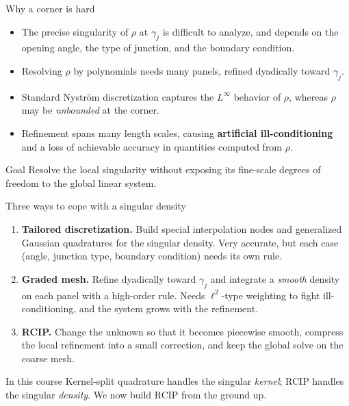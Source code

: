 \documentclass[aspectratio=169,11pt]{beamer}
\newcommand{\hl}[1]{{\color{CCMorange}\textbf{#1}}}
\begin{document}
\begin{frame}{Why a corner is hard}
\small
\begin{itemize}
  \item The precise singularity of $\rho$ at $\gamma_j$ is difficult to analyze,
  and depends on the opening angle, the type of junction, and the boundary
  condition.
  \item Resolving $\rho$ by polynomials needs many panels, refined dyadically
  toward $\gamma_j$.
  \item Standard Nystr\"om discretization captures the $L^\infty$ behavior of
  $\rho$, whereas $\rho$ may be \emph{unbounded} at the corner.
  \item Refinement spans many length scales, causing \hl{artificial
  ill-conditioning} and a loss of achievable accuracy in quantities computed
  from $\rho$.
\end{itemize}

\begin{block}{Goal}
Resolve the local singularity without exposing its fine-scale degrees of freedom
to the global linear system.
\end{block}
\end{frame}

\begin{frame}{Three ways to cope with a singular density}
\small
\begin{enumerate}
  \item \textbf{Tailored discretization.}  Build special interpolation nodes and
  generalized Gaussian quadratures for the singular density.  Very accurate, but
  each case (angle, junction type, boundary condition) needs its own rule.
  \item \textbf{Graded mesh.}  Refine dyadically toward $\gamma_j$ and integrate
  a \emph{smooth} density on each panel with a high-order rule.  Needs
  $\ell^2$-type weighting to fight ill-conditioning, and the system grows with
  the refinement.
  \item \textbf{RCIP.}  Change the unknown so that it becomes piecewise smooth,
  compress the local refinement into a small correction, and keep the global
  solve on the coarse mesh.
\end{enumerate}

\vspace{1mm}
\begin{block}{In this course}
Kernel-split quadrature handles the singular \emph{kernel}; RCIP handles the
singular \emph{density}.  We now build RCIP from the ground up.
\end{block}
\end{frame}
\end{document}
